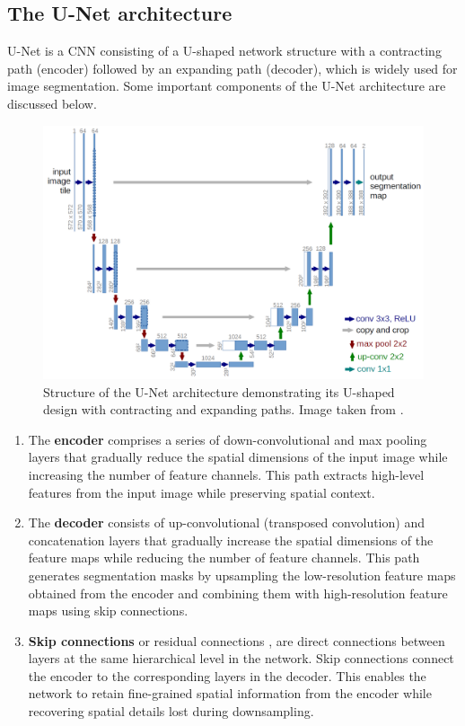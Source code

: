 \subsection{The U-Net architecture}
U-Net \cite{unet} is a CNN consisting of a U-shaped network structure with a contracting path (encoder) followed by an expanding path (decoder), which is widely used for image segmentation. Some important components of the U-Net architecture are discussed below. 
\begin{figure}[ht]
    \centering
    \includegraphics[width=12cm]{images/Theory-DL/UNet.png}
    \caption{Structure of the U-Net architecture demonstrating its U-shaped design with contracting and expanding paths. Image taken from \cite{unet}.}
    \label{fig:UNet}
\end{figure}
\begin{enumerate}
  \item The \textbf{encoder} comprises a series of down-convolutional and max pooling layers that gradually reduce the spatial dimensions of the input image while increasing the number of feature channels. This path extracts high-level features from the input image while preserving spatial context.
  \item The \textbf{decoder} consists of up-convolutional (transposed convolution) and concatenation layers that gradually increase the spatial dimensions of the feature maps while reducing the number of feature channels. This path generates segmentation masks by upsampling the low-resolution feature maps obtained from the encoder and combining them with high-resolution feature maps using skip connections.
  \item \textbf{Skip connections} or residual connections \cite{he2016deep}, are direct connections between layers at the same hierarchical level in the network. Skip connections connect the encoder to the corresponding layers in the decoder. This enables the network to retain fine-grained spatial information from the encoder while recovering spatial details lost during downsampling. 
\end{enumerate}
